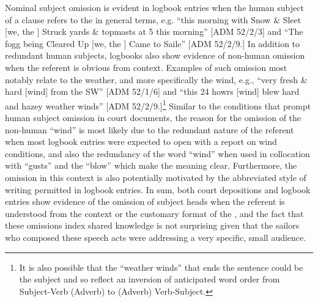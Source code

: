 Nominal subject omission is evident in logbook entries when the human subject of a clause refers to the  in general terms, e.g. “this morning with Snow \& Sleet [we, the ] Struck yards \& topmasts at 5 this morning” [ADM 52/2/3] and “The fogg being Cleared Up [we, the ] Came to Saile” [ADM 52/2/9.] In addition to redundant human subjects, logbooks also show evidence of non-human  omission when the referent is obvious from context. Examples of such omission most notably relate to the weather, and more specifically the wind, e.g., “very fresh \& hard [wind] from the SW” [ADM 52/1/6] and “this 24 howrs [wind] blew hard and hazey weather winds” [ADM 52/2/9.]\footnote{It is also possible that the  “weather winds” that ends the sentence could be the subject and so reflect an inversion of anticipated word order from Subject-Verb (Adverb) to (Adverb) Verb-Subject.}  Similar to the conditions that prompt human subject omission in court documents, the reason for the omission of the non-human  “wind” is most likely due to the redundant nature of the referent when most logbook entries were expected to open with a report on wind conditions, and also the redundancy of the word “wind” when used in collocation with “gusts” and the  “blow” which make the meaning clear. Furthermore, the omission in this context is also potentially motivated by the abbreviated style of writing permitted in logbook entries. In sum, both court depositions and logbook entries show evidence of the omission of  subject heads when the referent is understood from the context or the customary format of the , and the fact that these omissions index shared knowledge is not surprising given that the sailors who composed these speech acts were addressing a very specific, small audience.

